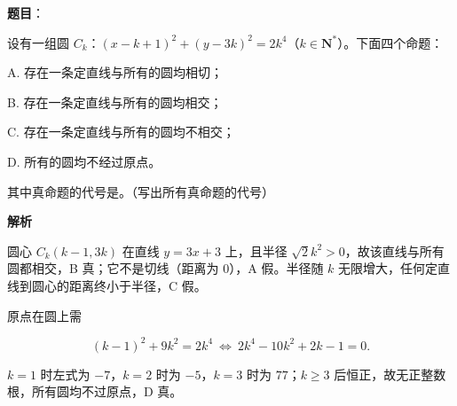 \begin{answer}

\textbf{题目}：

设有一组圆 $C_k$：$(x-k+1)^2+(y-3k)^2=2k^4$（$k\in\mathbf N^*$）。下面四个命题：

A. 存在一条定直线与所有的圆均相切；

B. 存在一条定直线与所有的圆均相交；

C. 存在一条定直线与所有的圆均不相交；

D. 所有的圆均不经过原点。

其中真命题的代号是\gkblank{}。（写出所有真命题的代号）

\textbf{解析}

圆心 $C_k(k-1,3k)$ 在直线 $y=3x+3$ 上，且半径 $\sqrt2k^2>0$，故该直线与所有圆都相交，B 真；它不是切线（距离为 $0$），A 假。半径随 $k$ 无限增大，任何定直线到圆心的距离终小于半径，C 假。

原点在圆上需

\nopagebreak[4]
\[(k-1)^2+9k^2=2k^4\ \Leftrightarrow\ 2k^4-10k^2+2k-1=0.\]

$k=1$ 时左式为 $-7$，$k=2$ 时为 $-5$，$k=3$ 时为 $77$；$k\geqslant3$ 后恒正，故无正整数根，所有圆均不过原点，D 真。


\end{answer}
